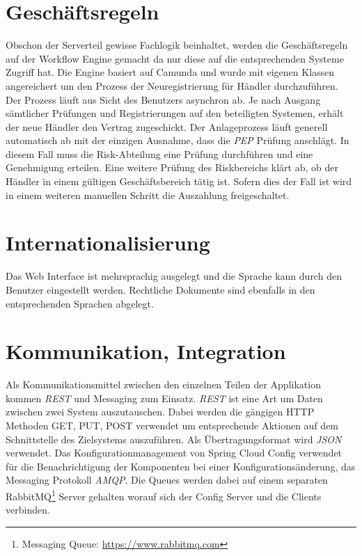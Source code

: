 \section{Geschäftsregeln}

Obschon der Serverteil gewisse Fachlogik beinhaltet, werden die Geschäftsregeln auf der Workflow Engine gemacht da nur diese auf die entsprechenden Systeme Zugriff hat. Die Engine basiert auf Camunda und wurde mit eigenen Klassen angereichert um den Prozess der Neuregistrierung für Händler durchzuführen. Der Prozess läuft aus Sicht des Benutzers asynchron ab. Je nach Ausgang sämtlicher Prüfungen und Registrierungen auf den beteiligten Systemen, erhält der neue Händler den Vertrag zugeschickt. Der Anlageprozess läuft generell automatisch ab mit der einzigen Ausnahme, dass die \textit{\gls{PEP}} Prüfung anschlägt. In diesem Fall muss die Risk-Abteilung eine Prüfung durchführen und eine Genehmigung erteilen. Eine weitere Prüfung des Riskbereichs klärt ab, ob der Händler in einem gültigen Geschäftsbereich tätig ist. Sofern dies der Fall ist wird in einem weiteren manuellen Schritt die Auszahlung freigeschaltet.

\section{Internationalisierung}

Das Web Interface ist mehrsprachig ausgelegt und die Sprache kann durch den Benutzer eingestellt werden. Rechtliche Dokumente sind ebenfalls in den entsprechenden Sprachen abgelegt.

\section{Kommunikation, Integration}

Als Kommunikationsmittel zwischen den einzelnen Teilen der Applikation kommen \textit{\gls{REST}} und Messaging zum Einsatz.  \textit{\gls{REST}} ist eine Art um Daten zwischen zwei System auszutauschen. Dabei werden die gängigen HTTP Methoden GET, PUT, POST  verwendet um entsprechende Aktionen auf dem Schnittstelle des Zielsystems auszuführen. Als Übertragungsformat wird  \textit{\gls{JSON}} verwendet.\newline
Das Konfigurationmanagement von Spring Cloud Config verwendet für die Benachrichtigung der Komponenten bei einer Konfigurationsänderung, das Messaging Protokoll  \textit{\gls{AMQP}}. Die Queues werden dabei auf einem separaten RabbitMQ\footnote{Messaging Queue: \url{https://www.rabbitmq.com}} Server gehalten worauf sich der Config Server und die Clients verbinden.

